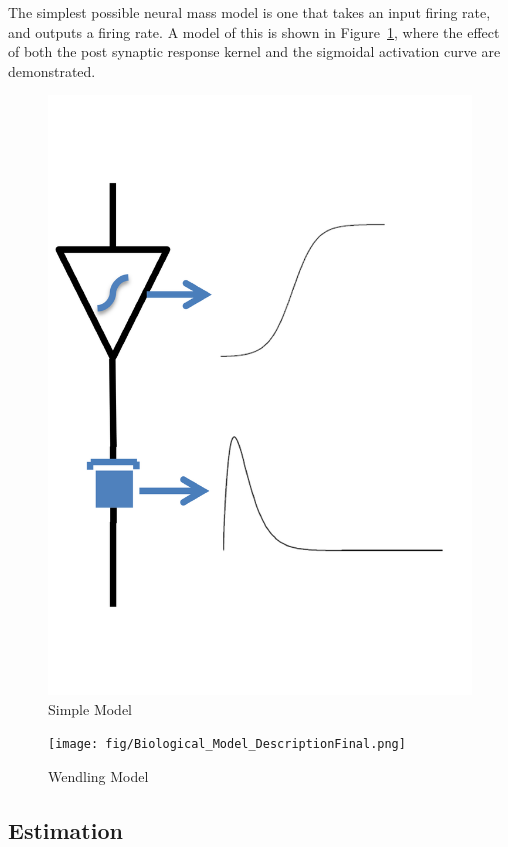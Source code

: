 \documentclass{article}%
\begin{document}
The simplest possible neural mass model is one that takes an input firing rate, and outputs a firing rate. A model of this is shown in Figure~\ref{fig: Simple}, where the effect of both the post synaptic response kernel and the sigmoidal activation curve are demonstrated.

\begin{figure}
	\centering
		\includegraphics{Biological_Response.pdf}
	\caption{Simple Model}
	\label{fig: Simple}
\end{figure}

\begin{figure}
	\centering
		\texttt{[image: fig/Biological\_Model\_DescriptionFinal.png]}
	\caption{Wendling Model}
	\label{fig: Biological}
\end{figure}


\subsection{Estimation}
\end{document}
